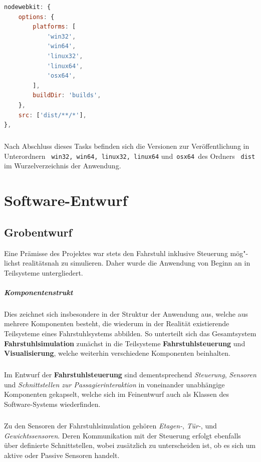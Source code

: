 \begin{lstlisting}[language=JavaScript,label=JS:grunt_webkit_config,caption=grunt nodewebkit-Konfiguration]
nodewebkit: {
	options: {
		platforms: [
			'win32',
			'win64',
			'linux32',
			'linux64',
			'osx64',
		],
		buildDir: 'builds',
	},
	src: ['dist/**/*'],
},
\end{lstlisting}

\paragraph{}
Nach Abschluss dieses Tasks befinden sich die Versionen zur Veröffentlichung in Unterordnern \texttt{ win32, win64, linux32, linux64} und\texttt{ osx64 }des Ordners \texttt{ dist } im Wurzelverzeichnis der Anwendung.

\chapter{Software-Entwurf}
\section{Grobentwurf}
Eine Prämisse des Projektes war stets den Fahrstuhl inklusive Steuerung mög"-lichst realitätsnah zu simulieren. Daher wurde die Anwendung von Beginn an in Teilsysteme untergliedert.

\paragraph{Komponentenstrukt}
Dies zeichnet sich insbesondere in der Struktur der Anwendung aus, welche aus mehrere Komponenten besteht, die wiederum in der Realität existierende Teilsysteme eines Fahrstuhlsystems abbilden.
So unterteilt sich das Gesamtsystem \textbf{Fahrstuhlsimulation} zunächst in die Teilsysteme \textbf{Fahrstuhlsteuerung} und \textbf{Visualisierung}, welche weiterhin verschiedene Komponenten beinhalten.

\paragraph{}
Im Entwurf der \textbf{Fahrstuhlsteuerung} sind dementsprechend \textit{Steuerung}, \textit{Sensoren} und \textit{Schnittstellen zur Passagierinteraktion} in voneinander unabhängige Komponenten gekapselt, welche sich im Feinentwurf auch als Klassen des Software-Systems wiederfinden.

\paragraph{}
Zu den Sensoren der Fahrstuhlsimulation gehören \textit{Etagen-}, \textit{Tür-}, und \textit{Gewichtssensoren}.
Deren Kommunikation mit der Steuerung erfolgt ebenfalls über definierte Schnittstellen, wobei zusätzlich zu unterscheiden ist, ob es sich um aktive oder Passive Sensoren handelt.

